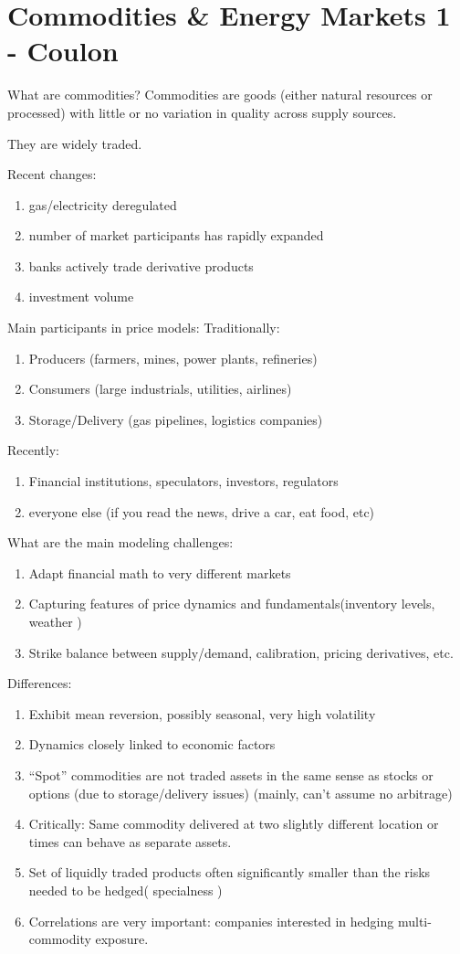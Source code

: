 \chapter{Commodities \& Energy Markets 1 - Coulon}
What are commodities? Commodities are goods (either natural resources or processed) with little or no variation in quality across supply sources.

They are widely traded.

Recent changes:
\begin{enumerate}
	\item gas/electricity deregulated
	\item number of market participants has rapidly expanded
	\item banks actively trade derivative products
	\item investment volume
\end{enumerate}

Main participants in price models: Traditionally:
\begin{enumerate}
	\item Producers (farmers, mines, power plants, refineries)
	\item Consumers (large industrials, utilities, airlines)
	\item Storage/Delivery (gas pipelines, logistics companies)
\end{enumerate}
Recently:
\begin{enumerate}
	\item Financial institutions, speculators, investors, regulators
	\item everyone else (if you read the news, drive a car, eat food, etc)
\end{enumerate}

What are the main modeling challenges:
\begin{enumerate}
	\item Adapt financial math to very different markets
	\item Capturing features of price dynamics and fundamentals(inventory levels, weather )
	\item Strike balance between supply/demand, calibration, pricing derivatives, etc.
\end{enumerate}

Differences:
\begin{enumerate}
	\item Exhibit mean reversion, possibly seasonal, very high volatility
	\item Dynamics closely linked to economic factors
	\item ``Spot'' commodities are not traded assets in the same sense as stocks or options (due to storage/delivery issues) (mainly, can't assume no arbitrage)
	\item Critically: Same commodity delivered at two slightly different location or times can behave as separate assets.
	\item Set of liquidly traded products often significantly smaller than the risks needed to be hedged( specialness ) 
	\item Correlations are very important: companies interested in hedging multi-commodity exposure.
\end{enumerate}

